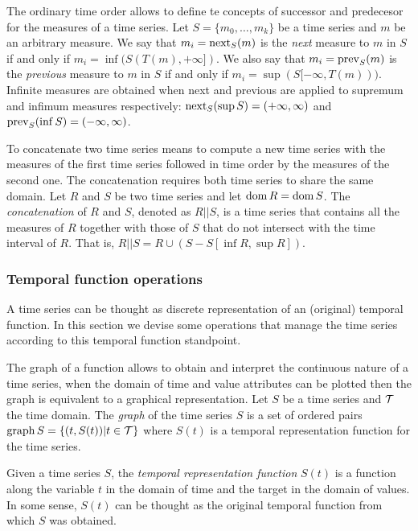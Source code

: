 The ordinary time order allows to define te concepts of successor and
predecesor for the measures of a time series.
%
Let $S=\{m_0,\ldots,m_k\}$ be a time series and $m$ be an arbitrary
measure.
%
We say that $m_i=\operatorname*{next}_S(m)$ is the \emph{next} measure to $m$ in $S$ if and
only if $m_i=\inf(S(T(m),+\infty])$.  
%
We also say that $m_i=\operatorname*{prev}_S(m)$ is the \emph{previous} measure to
$m$ in $S$ if and only if $m_i=\sup(S[-\infty,T(m)))$. 
%
Infinite measures are obtained when next and previous are applied to
supremum and infimum measures respectively: $\operatorname*{next}_S(\sup
S)=(+\infty,\infty)$ and $\operatorname*{prev}_S(\inf S)=(-\infty,\infty)$.

To concatenate two time series means to compute a new time series with
the measures of the first time series followed in time order by the
measures of the second one. 
%
The concatenation requires both time series to share the same domain.
Let $R$ and $S$ be two time series and let $\operatorname{dom} R=\operatorname{dom} S$. The
\emph{concatenation} of $R$ and $S$, denoted as $R||S$, is a time
series that contains all the measures of $R$ together with those of
$S$ that do not intersect with the time interval of $R$. That is,
$R||S= R\cup (S - S[\inf R,\sup R])$.


\subsubsection{Temporal function operations}
\label{sec:model:tfunc}

A time series can be thought as discrete representation of an
(original) temporal function. In this section we devise some
operations that manage the time series according to this temporal
function standpoint.  
%

The graph of a function allows to obtain and interpret the
continuous nature of a time series, when the domain of time and value
attributes can be plotted then the graph is equivalent to a graphical
representation.  
%
Let $S$ be a time series and $\cal{T}$ the time domain. The \emph{graph} of
the time series $S$ is a set of ordered pairs $\operatorname*{graph} S
=\{(t,S(t))|t\in \cal{T}\}$ where $S(t)$ is a temporal representation
function for the time series.
%

Given a time series $S$, the \emph{temporal representation function}
$S(t)$ is a function along the variable $t$ in the domain of
time and the target in the domain of values.
%
In some sense, $S(t)$ can be thought as the original temporal function
from which $S$ was obtained.
%

